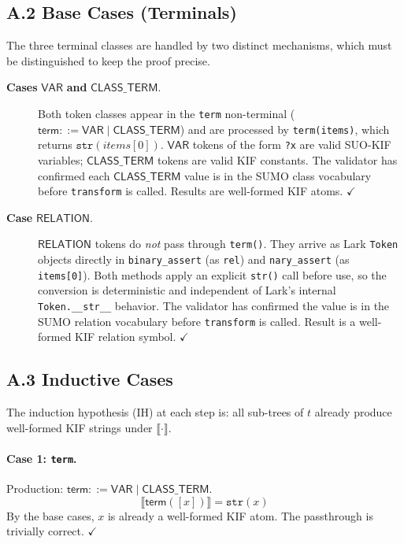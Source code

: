 \subsection*{A.2 Base Cases (Terminals)}

The three terminal classes are handled by two distinct mechanisms, which must be
distinguished to keep the proof precise.

\begin{description}
  \item[\textbf{Cases} $\mathsf{VAR}$ \textbf{and} $\mathsf{CLASS\_TERM}$.]
    Both token classes appear in the \texttt{term} non-terminal
    ($\mathsf{term} ::= \mathsf{VAR} \mid \mathsf{CLASS\_TERM}$) and are processed
    by \texttt{term(items)}, which returns $\texttt{str}(\mathit{items}[0])$.
    $\mathsf{VAR}$ tokens of the form \texttt{?x} are valid SUO-KIF variables;
    $\mathsf{CLASS\_TERM}$ tokens are valid KIF constants.
    The validator has confirmed each $\mathsf{CLASS\_TERM}$ value is in the SUMO
    class vocabulary before \texttt{transform} is called.
    Results are well-formed KIF atoms. \hfill$\checkmark$

  \item[\textbf{Case} $\mathsf{RELATION}$.]
    $\mathsf{RELATION}$ tokens do \emph{not} pass through \texttt{term()}.
    They arrive as Lark \texttt{Token} objects directly in \texttt{binary\_assert}
    (as \texttt{rel}) and \texttt{nary\_assert} (as \texttt{items[0]}).
    Both methods apply an explicit \texttt{str()} call before use, so the
    conversion is deterministic and independent of Lark's internal
    \texttt{Token.\_\_str\_\_} behavior.
    The validator has confirmed the value is in the SUMO relation vocabulary
    before \texttt{transform} is called.
    Result is a well-formed KIF relation symbol. \hfill$\checkmark$
\end{description}

\subsection*{A.3 Inductive Cases}

The induction hypothesis (IH) at each step is: all sub-trees of $t$ already produce
well-formed KIF strings under $\llbracket \cdot \rrbracket$.

\paragraph{Case 1: \texttt{term}.}
Production: $\mathsf{term} ::= \mathsf{VAR} \mid \mathsf{CLASS\_TERM}$.
\begin{equation*}
  \llbracket \mathsf{term}([x]) \rrbracket = \texttt{str}(x)
\end{equation*}
By the base cases, $x$ is already a well-formed KIF atom. The passthrough is
trivially correct. \hfill$\checkmark$

